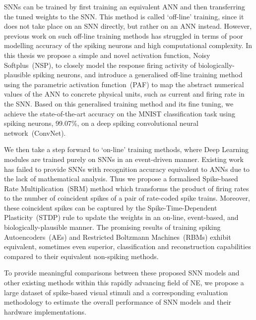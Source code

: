 SNNs can be trained by first training an equivalent ANN and then transferring the tuned weights to the SNN.
This method is called `off-line' training, since it does not take place on an SNN directly, but rather on an ANN instead.
However, previous work on such off-line training methods has struggled in terms of poor modelling accuracy of the spiking neurons and high computational complexity.
In this thesis we propose a simple and novel activation function, Noisy Softplus~(NSP), to closely model the response firing activity of biologically-plausible spiking neurons,
and introduce a generalised off-line training method using the parametric activation function~(PAF) to map the abstract numerical values of the ANN to concrete physical units, such as current and firing rate in the SNN.
Based on this generalised training method and its fine tuning, we achieve the state-of-the-art accuracy on the MNIST classification task using spiking neurons, 99.07\%, on a deep spiking convolutional neural network~(ConvNet).


We then take a step forward to `on-line' training methods, where Deep Learning modules are trained purely on SNNs in an event-driven manner.
Existing work has failed to provide SNNs with recognition accuracy equivalent to ANNs due to the lack of mathematical analysis. 
Thus we propose a formalised Spike-based Rate Multiplication~(SRM) method which transforms the product of firing rates to the number of coincident spikes of a pair of rate-coded spike trains.
Moreover, these coincident spikes can be captured by the Spike-Time-Dependent Plasticity~(STDP) rule to update the weights in an on-line, event-based, and biologically-plausible manner.
The promising results of training spiking Autoencoders~(AEs) and Restricted Boltzmann Machines~(RBMs) exhibit equivalent, sometimes even superior, classification and reconstruction capabilities compared to their equivalent non-spiking methods.

To provide meaningful comparisons between these proposed SNN models and other existing methods within this rapidly advancing field of NE, we propose a large dataset of spike-based visual stimuli and a corresponding evaluation methodology to estimate the overall performance of SNN models and their hardware implementations.

